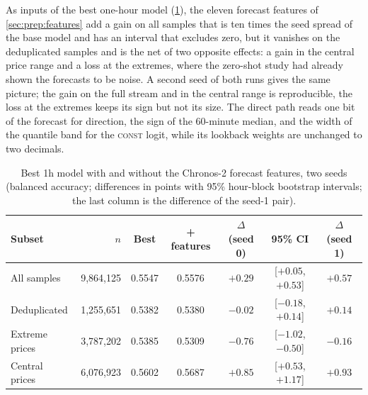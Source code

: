 As inputs of the best one-hour model (\cref{tab:exp:tsfmfeat}), the eleven forecast
features of \cref{sec:prep:features} add a gain on all samples that is ten times the seed
spread of the base model and has an interval that excludes zero, but it vanishes on the
deduplicated samples and is the net of two opposite effects: a gain in the central price
range and a loss at the extremes, where the zero-shot study had already shown the forecasts
to be noise.  A second seed of both runs gives the same picture; the gain on the full stream
and in the central range is reproducible, the loss at the extremes keeps its sign but not
its size.  The direct path reads one bit of the forecast for direction, the sign of the
60-minute median, and the width of the quantile band for the \textsc{const} logit, while its
lookback weights are unchanged to two decimals.

\begin{table}[t]
\centering
\caption{Best 1h model with and without the Chronos-2 forecast features, two seeds
(balanced accuracy; differences in points with 95\% hour-block bootstrap intervals; the
last column is the difference of the seed-1 pair).}
\label{tab:exp:tsfmfeat}
\begin{fittable}\begin{tabular}{lrccccc}
\toprule
Subset & $n$ & Best & + features & $\Delta$ (seed 0) & 95\% CI & $\Delta$ (seed 1) \\
\midrule
All samples          & 9{,}864{,}125 & 0.5547 & 0.5576 & $+0.29$ & [$+0.05$, $+0.53$] & $+0.57$ \\
Deduplicated         & 1{,}255{,}651 & 0.5382 & 0.5380 & $-0.02$ & [$-0.18$, $+0.14$] & $+0.14$ \\
Extreme prices       & 3{,}787{,}202 & 0.5385 & 0.5309 & $-0.76$ & [$-1.02$, $-0.50$] & $-0.16$ \\
Central prices       & 6{,}076{,}923 & 0.5602 & 0.5687 & $+0.85$ & [$+0.53$, $+1.17$] & $+0.93$ \\
\bottomrule
\end{tabular}\end{fittable}
\end{table}

